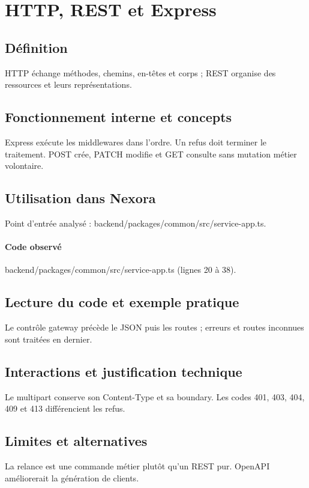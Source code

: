 \section{HTTP, REST et Express}
\subsection*{Définition}
HTTP échange méthodes, chemins, en-têtes et corps ; REST organise des ressources et leurs représentations.

\subsection*{Fonctionnement interne et concepts}
Express exécute les middlewares dans l’ordre. Un refus doit terminer le traitement. POST crée, PATCH modifie et GET consulte sans mutation métier volontaire.

\subsection*{Utilisation dans Nexora}
Point d’entrée analysé : backend/packages/common/src/service-app.ts.

\paragraph{Code observé} backend/packages/common/src/service-app.ts (lignes 20 à 38).

\subsection*{Lecture du code et exemple pratique}
Le contrôle gateway précède le JSON puis les routes ; erreurs et routes inconnues sont traitées en dernier.

\subsection*{Interactions et justification technique}
Le multipart conserve son Content-Type et sa boundary. Les codes 401, 403, 404, 409 et 413 différencient les refus.

\subsection*{Limites et alternatives}
La relance est une commande métier plutôt qu’un REST pur. OpenAPI améliorerait la génération de clients.

